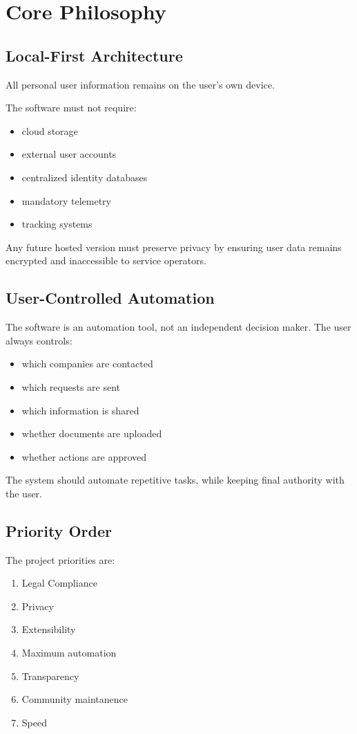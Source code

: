 
\chapter{Core Philosophy}

\section{Local-First Architecture}

All personal user information remains on the user's own device.

The software must not require:

\begin{itemize}
	\item cloud storage
	\item external user accounts
	\item centralized identity databases
	\item mandatory telemetry
	\item tracking systems
\end{itemize}

Any future hosted version must preserve privacy by ensuring user data remains encrypted and inaccessible to service operators.

\section{User-Controlled Automation}

The software is an automation tool, not an independent decision maker.
The user always controls:
\begin{itemize}
	\item which companies are contacted
	\item which requests are sent
	\item which information is shared
	\item whether documents are uploaded
	\item whether actions are approved
\end{itemize}

The system should automate repetitive tasks, while keeping final authority with the user.

\section{Priority Order}
The project priorities are:
\begin{enumerate}
	\item Legal Compliance
	\item Privacy
	\item Extensibility
	\item Maximum automation
	\item Transparency
	\item Community maintanence
	\item Speed
\end{enumerate}

\sentinelchapterend
